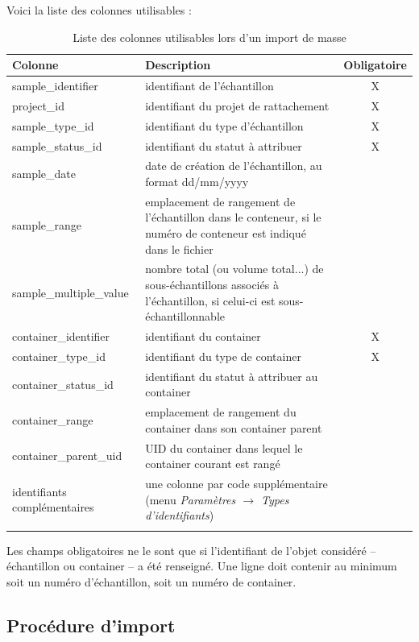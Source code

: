 Voici la liste des colonnes utilisables :
\begin{longtable}{|p{4cm}|p{8cm}| c|}
\hline
\textbf{Colonne} & \textbf{Description} & \textbf{Obligatoire} \\
\hline
\endhead
sample\_identifier & identifiant de l'échantillon & X \\
\hline
project\_id & identifiant du projet de rattachement & X \\
\hline
sample\_type\_id & identifiant du type d'échantillon & X \\
\hline
sample\_status\_id & identifiant du statut à attribuer & X \\
\hline
sample\_date & date de création de l'échantillon, au format dd/mm/yyyy & \\
\hline
sample\_range & emplacement de rangement de l'échantillon dans le conteneur, si le numéro de conteneur est indiqué dans le fichier & \\
\hline
sample\_multiple\_value & nombre total (ou volume total...) de sous-échantillons associés à l'échantillon, si celui-ci est sous-échantillonnable & \\
\hline
container\_identifier & identifiant du container & X \\
\hline
container\_type\_id & identifiant du type de container & X \\
\hline
container\_status\_id & identifiant du statut à attribuer au container & \\
\hline
container\_range & emplacement de rangement du container dans son container parent & \\
\hline
container\_parent\_uid & UID du container dans lequel le container courant est rangé & \\
\hline
identifiants complémentaires & une colonne par code supplémentaire (menu \textit{Paramètres $\rightarrow$ Types d'identifiants}) & \\
\hline

\caption{Liste des colonnes utilisables lors d'un import de masse}
\end{longtable}

Les champs obligatoires ne le sont que si l'identifiant de l'objet considéré -- échantillon ou container -- a été renseigné. Une ligne doit contenir au minimum soit un numéro d'échantillon, soit un numéro de container.

\subsection{Procédure d'import}


